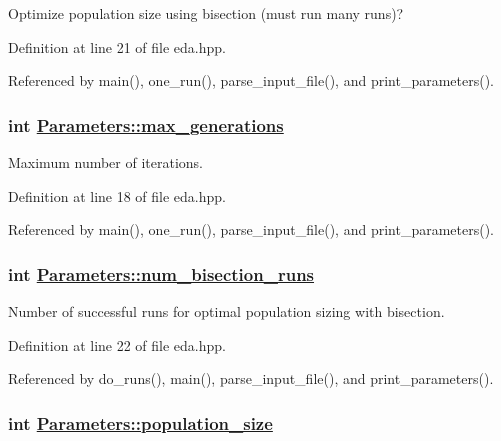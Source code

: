 Optimize population size using bisection (must run many runs)? 



Definition at line 21 of file eda.hpp.

Referenced by main(), one\_\-run(), parse\_\-input\_\-file(), and print\_\-parameters().\hypertarget{struct_parameters_d796bbf20113a349eed4f469fb80e04f}{
\subsubsection[max\_\-generations]{\setlength{\rightskip}{0pt plus 5cm}int \hyperlink{struct_parameters_d796bbf20113a349eed4f469fb80e04f}{Parameters::max\_\-generations}}}
\label{struct_parameters_d796bbf20113a349eed4f469fb80e04f}


Maximum number of iterations. 



Definition at line 18 of file eda.hpp.

Referenced by main(), one\_\-run(), parse\_\-input\_\-file(), and print\_\-parameters().\hypertarget{struct_parameters_5fcf099ba77f2cf31f3de4e7d190d97d}{
\subsubsection[num\_\-bisection\_\-runs]{\setlength{\rightskip}{0pt plus 5cm}int \hyperlink{struct_parameters_5fcf099ba77f2cf31f3de4e7d190d97d}{Parameters::num\_\-bisection\_\-runs}}}
\label{struct_parameters_5fcf099ba77f2cf31f3de4e7d190d97d}


Number of successful runs for optimal population sizing with bisection. 



Definition at line 22 of file eda.hpp.

Referenced by do\_\-runs(), main(), parse\_\-input\_\-file(), and print\_\-parameters().\hypertarget{struct_parameters_7d367fca1aa50edd6c5ebd6c34dab46f}{
\subsubsection[population\_\-size]{\setlength{\rightskip}{0pt plus 5cm}int \hyperlink{struct_parameters_7d367fca1aa50edd6c5ebd6c34dab46f}{Parameters::population\_\-size}}}
\label{struct_parameters_7d367fca1aa50edd6c5ebd6c34dab46f}



